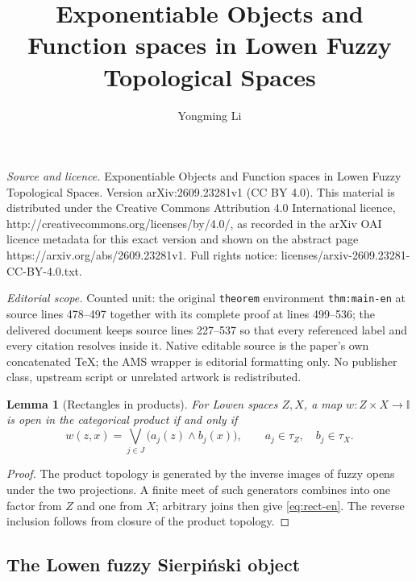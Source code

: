\documentclass[10pt,a4paper]{amsart}
\numberwithin{equation}{section}
\newtheorem{lemma}[theorem]{Lemma}
\newcommand{\I}{\mathbb I}
\begin{document}
\title[Exponentiable Objects and Function spaces in Lowen Fuzzy Top]{Exponentiable Objects and Function spaces in Lowen Fuzzy Topological Spaces}
\author{Yongming Li}
\date{}
\maketitle
\noindent\emph{Source and licence.} Exponentiable Objects and Function spaces in Lowen Fuzzy Topological Spaces. Version arXiv:2609.23281v1 (CC BY 4.0). This material is distributed under the Creative Commons Attribution 4.0 International licence, http://creativecommons.org/licenses/by/4.0/, as recorded in the arXiv OAI licence metadata for this exact version and shown on the abstract page https://arxiv.org/abs/2609.23281v1. Full rights notice: licenses/arxiv-2609.23281-CC-BY-4.0.txt.\par\smallskip
\noindent\textit{Editorial scope.} Counted unit: the original \texttt{theorem} environment \texttt{thm:main-en} at source lines 478--497 together with its complete proof at lines 499--536; the delivered document keeps source lines 227--537 so that every referenced label and every citation resolves inside it. Native editable source is the paper's own concatenated TeX; the AMS wrapper is editorial formatting only. No publisher class, upstream script or unrelated artwork is redistributed.
\begin{lemma}[Rectangles in products]\label{lem:rect-en}
For Lowen spaces \(Z,X\), a map \(w:Z\times X\to\I\) is open in the
categorical product if and only if
\begin{equation}\label{eq:rect-en}
 w(z,x)=\bigvee_{j\in J}\bigl(a_j(z)\wedge b_j(x)\bigr),
 \qquad a_j\in\tau_Z,\quad b_j\in\tau_X.
\end{equation}
\end{lemma}

\begin{proof}
The product topology is generated by the inverse images of fuzzy opens
under the two projections.  A finite meet of such generators combines
into one factor from \(Z\) and one from \(X\); arbitrary joins then give
\eqref{eq:rect-en}.  The reverse inclusion follows from closure of the
product topology.
\end{proof}

\subsection{The Lowen fuzzy Sierpiński object}
\end{document}
